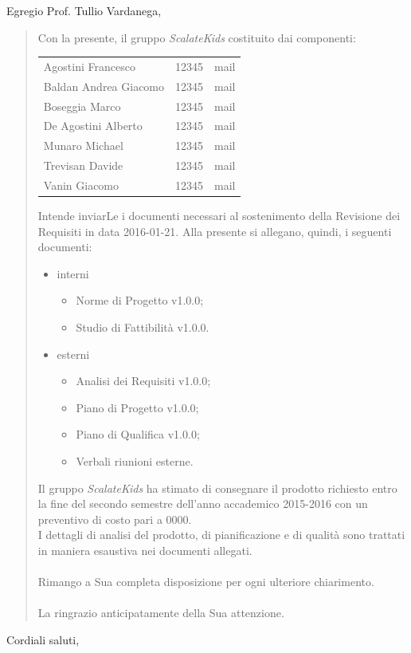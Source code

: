 \documentclass{letter}
\begin{document}
\begin{letter}
  \opening{Egregio Prof. Tullio Vardanega,}
  \begin{quotation}
    Con la presente, il gruppo \textit{ScalateKids} costituito dai componenti:
    \begin{center}
      \begin{tabular}[H]{l l l}
        Agostini Francesco & 12345 & mail \\
        Baldan Andrea Giacomo & 12345 & mail \\
        Boseggia Marco & 12345 & mail \\
        De Agostini Alberto & 12345 & mail \\
        Munaro Michael & 12345 & mail \\
        Trevisan Davide & 12345 & mail \\
        Vanin Giacomo & 12345 & mail \\
      \end{tabular}
    \end{center}
    Intende inviarLe i documenti necessari al sostenimento della Revisione dei Requisiti in data 2016-01-21.
    Alla presente si allegano, quindi, i seguenti documenti:
    \begin{itemize}
    \item interni
      \begin{itemize}
      \item Norme di Progetto v1.0.0;
      \item Studio di Fattibilità v1.0.0.
      \end{itemize}
    \item esterni
      \begin{itemize}
      \item Analisi dei Requisiti v1.0.0;
      \item Piano di Progetto v1.0.0;
      \item Piano di Qualifica v1.0.0;
      \item Verbali riunioni esterne.
      \end{itemize}
    \end{itemize}
    Il gruppo \textit{ScalateKids} ha stimato di consegnare il prodotto richiesto entro la fine del secondo semestre dell'anno accademico 2015-2016
    con un preventivo di costo pari a 0000.\\
    I dettagli di analisi del prodotto, di pianificazione e di qualità sono trattati in maniera esaustiva nei documenti allegati.\\ \\
    Rimango a Sua completa disposizione per ogni ulteriore chiarimento. \\ \\
    La ringrazio anticipatamente della Sua attenzione.\\
  \end{quotation}
  \closing{Cordiali saluti,}
\end{letter}
\end{document}
